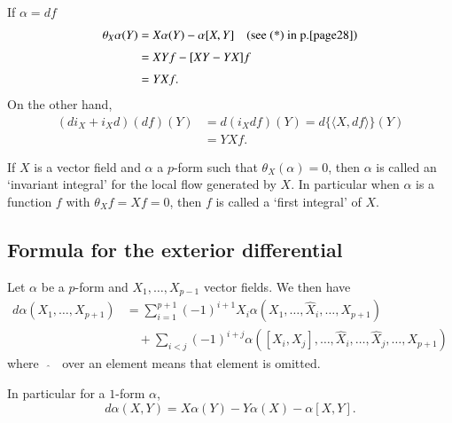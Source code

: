 If $\alpha=df$
\begin{align*}
\theta_{X}\alpha(Y) &= X\alpha(Y)-\alpha[X,Y]\quad \text{(see (*) in p.\pageref{page28})}\\[3pt]
&= XYf-[XY-YX]f\\[3pt]
&= YXf.
\end{align*}
On the other hand,
\begin{align*}
(di_{X}+i_{X}d)(df)(Y) &= d(i_{X}df)(Y)=d\{\langle X,df\rangle\}(Y)\\[3pt]
                     &= YXf.
\end{align*}

\begin{remark*}
If $X$ is a vector field and $\alpha$ a $p$-form such that $\theta_{X}(\alpha)=0$, then $\alpha$ is called an `invariant integral' for the local flow generated by $X$. In particular when $\alpha$ is a function $f$ with $\theta_{X}f=Xf=0$, then $f$ is called a `first integral' of $X$.
\end{remark*}

\subsection*{Formula for the exterior differential}

\begin{proposition}\label{sec6-prop6.6}
Let\label{page30} $\alpha$ be a $p$-form and $X_{1},\ldots,X_{p-1}$ vector fields. We then have
\begin{align*}
d\alpha(X_{1},\ldots,X_{p+1}) &= \sum\limits^{p+1}_{i=1}(-1)^{i+1}X_{i}\alpha(X_{1},\ldots,\widehat{X}_{i},\ldots,X_{p+1})\\[3pt]
&\quad +\sum\limits_{i<j}(-1)^{i+j}\alpha\left([X_{i},X_{j}],\ldots,\widehat{X}_{i},\ldots,\widehat{X}_{j},\ldots,X_{p+1}\right)
\end{align*}
where~ $\widehat{~}$~ over an element means that element is omitted.
\end{proposition}

In particular for a $1$-form $\alpha$,
$$
d\alpha (X,Y)=X\alpha(Y)-Y\alpha(X)-\alpha[X,Y].
$$

